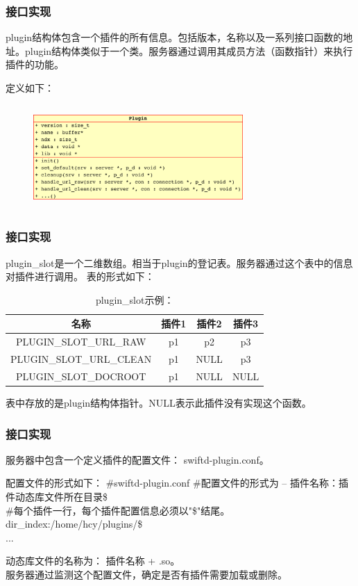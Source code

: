 \documentclass[10pt,dvipdfm]{beamer}
\begin{document}
\begin{frame}
	\frametitle{接口实现}
	plugin结构体包含一个插件的所有信息。包括版本，名称以及一系列接口函数的地址。plugin结构体类似于一个类。服务器通过调用其成员方法（函数指针）来执行插件的功能。
	
	定义如下：
	\begin{figure}[htbp]
	\centering
	\includegraphics[height=4cm, width=8cm]{plugin_s.eps}
	\end{figure}
\end{frame}

\begin{frame}
	\frametitle{接口实现}
	plugin\_slot是一个二维数组。相当于plugin的登记表。服务器通过这个表中的信息对插件进行调用。
	表的形式如下：
	\begin{table}[htbp]
	\caption{plugin\_slot示例：}
	\centering
	\begin{tabular}{cccc} %
	\toprule
	\centering 名称 & 插件1 & 插件2 &插件3\\
	\midrule
	\centering PLUGIN\_SLOT\_URL\_RAW & p1 &  p2 & p3\\
	\centering PLUGIN\_SLOT\_URL\_CLEAN &  p1 &  NULL & p3\\
	\centering PLUGIN\_SLOT\_DOCROOT & p1 & NULL & NULL\\
	\bottomrule
	\end{tabular}
	\end{table}
	\begin{block}{}
		表中存放的是plugin结构体指针。NULL表示此插件没有实现这个函数。
	\end{block}
\end{frame}

\begin{frame}
	\frametitle{接口实现}
	服务器中包含一个定义插件的配置文件： swiftd-plugin.conf。
	
	\begin{block}{配置文件的形式如下：}	
		\#swiftd-plugin.conf
		\#配置文件的形式为  -- 插件名称：插件动态库文件所在目录\$\\
		\#每个插件一行，每个插件配置信息必须以"\$"结尾。\\
		dir\_index:/home/hcy/plugins/\$\\
		...
	\end{block}
	
	\pause
	
	\begin{block}{}
	动态库文件的名称为： \textcolor{read}{插件名称 + .so}。\\
	服务器通过监测这个配置文件，确定是否有插件需要加载或删除。
	\end{block}
\end{frame}
\end{document}
